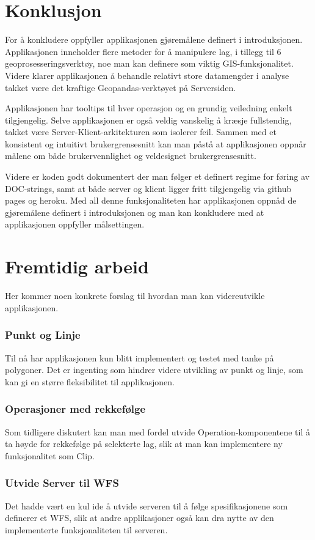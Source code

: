 \section{Konklusjon}

For å konkludere oppfyller applikasjonen gjøremålene definert i introduksjonen. Applikasjonen inneholder flere metoder for å manipulere lag, i tillegg til 6 geoprosesseringsverktøy, noe man kan definere som viktig GIS-funksjonalitet. Videre klarer applikasjonen å behandle relativt store datamengder i analyse takket være det kraftige Geopandas-verktøyet på Serversiden. 

Applikasjonen har tooltips til hver operasjon og en grundig veiledning enkelt tilgjengelig. Selve applikasjonen er også veldig vanskelig å kræsje fullstendig, takket være Server-Klient-arkitekturen som isolerer feil. Sammen med et konsistent og intuitivt brukergrensesnitt kan man påstå at applikasjonen oppnår målene om både brukervennlighet og veldesignet brukergrensesnitt. 

Videre er koden godt dokumentert der man følger et definert regime for føring av DOC-strings, samt at både server og klient ligger fritt tilgjengelig via github pages og heroku. Med all denne funksjonaliteten har applikasjonen oppnåd de gjøremålene definert i introduksjonen og man kan konkludere med at applikasjonen oppfyller målsettingen. 

\section{Fremtidig arbeid}

Her kommer noen konkrete forslag til hvordan man kan videreutvikle applikasjonen. 

\subsubsection{Punkt og Linje}

Til nå har applikasjonen kun blitt implementert og testet med tanke på polygoner. Det er ingenting som hindrer videre utvikling av punkt og linje, som kan gi en større fleksibilitet til applikasjonen. 

\subsubsection{Operasjoner med rekkefølge}

Som tidligere diskutert kan man med fordel utvide Operation-komponentene til å ta høyde for rekkefølge på selekterte lag, slik at man kan implementere ny funksjonalitet som Clip. 

\subsubsection{Utvide Server til WFS}

Det hadde vært en kul ide å utvide serveren til å følge spesifikasjonene som definerer et WFS\cite{OGC}, slik at andre applikasjoner også kan dra nytte av den implementerte funksjonaliteten til serveren.  
